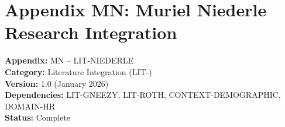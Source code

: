 
\chapter*{Appendix MN: Muriel Niederle Research Integration}
\label{app:niederle}

\begin{tcolorbox}[colback=white,colframe=black!75!white,title=Appendix Metadata]
\textbf{Appendix:} MN -- LIT-NIEDERLE \\
\textbf{Category:} Literature Integration (LIT-) \\
\textbf{Version:} 1.0 (January 2026) \\
\textbf{Dependencies:} LIT-GNEEZY, LIT-ROTH, CONTEXT-DEMOGRAPHIC, DOMAIN-HR \\
\textbf{Status:} Complete
\end{tcolorbox}

